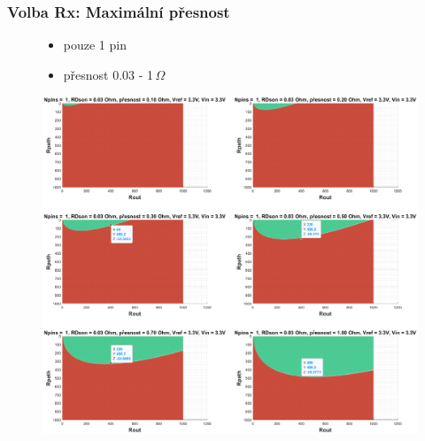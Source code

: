 \documentclass[%
  12pt,       				%
	t,                  %
	aspectratio=1610,   %
	unicode,						%
]{beamer}				    	%
\begin{document}
\begin{frame} 
	\frametitle{Volba Rx: Maximální přesnost}
	\begin{figure}[ht!]
		\centering
		\begin{minipage}{0.3\textwidth}
			\begin{itemize}
				\item pouze 1 pin
				\item přesnost 0.03 - 1\,$\Omega$
			\end{itemize}
		\end{minipage}
		\begin{minipage}{0.65\textwidth}
		\includegraphics[height = 0.8\textheight]{obrazky/MERENI_JEDNOHO_PINU.eps}
		\end{minipage}
	\end{figure}
\end{frame}
\end{document}
